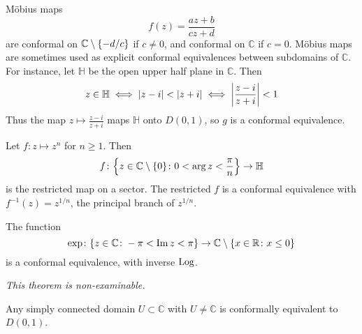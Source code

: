\begin{example}
	M\"obius maps
	\[
		f(z) = \frac{az+b}{cz+d}
	\]
	are conformal on \( \mathbb C \setminus \qty{-d/c} \) if \( c \neq 0 \), and conformal on \( \mathbb C \) if \( c = 0 \).
	M\"obius maps are sometimes used as explicit conformal equivalences between subdomains of \( \mathbb C \).
	For instance, let \( \mathbb H \) be the open upper half plane in \( \mathbb C \).
	Then
	\[
		z \in \mathbb H \iff \abs{z - i} < \abs{z + i} \iff \abs{\frac{z - i}{z + i}} < 1
	\]
	Thus the map \( z \mapsto \frac{z-i}{z+i} \) maps \( \mathbb H \) onto \( D(0,1) \), so \( g \) is a conformal equivalence.
\end{example}
\begin{example}
	Let \( f \colon z \mapsto z^n \) for \( n \geq 1 \).
	Then
	\[
		f \colon \qty{z \in \mathbb C \setminus \qty{0} \colon 0 < \arg z < \frac{\pi}{n}} \to \mathbb H
	\]
	is the restricted map on a sector.
	The restricted \( f \) is a conformal equivalence with \( f^{-1}(z) = z^{1/n} \), the principal branch of \( z^{1/n} \).
\end{example}
\begin{example}
	The function
	\[
		\exp \colon \qty{z \in \mathbb C \colon -\pi < \Im z < \pi} \to \mathbb C \setminus \qty{x \in \mathbb R \colon x \leq 0}
	\]
	is a conformal equivalence, with inverse \( \operatorname{Log} \).
\end{example}
\begin{theorem}
	\textit{This theorem is non-examinable.}

	Any simply connected domain \( U \subset \mathbb C \) with \( U \neq \mathbb C \) is conformally equivalent to \( D(0,1) \).
\end{theorem}
